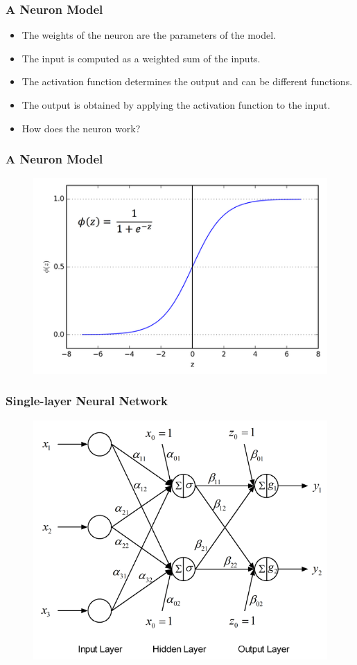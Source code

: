 \documentclass{beamer}
\begin{document}
\begin{frame}
	\frametitle{A Neuron Model}
\begin{itemize}
	\item The weights of the neuron are the parameters of the model.
	\item The input is computed as a weighted sum of the inputs.
	\item The activation function determines the output and can be different functions.
	\item The output is obtained by applying the activation function to the input.
	\item How does the neuron work?
\end{itemize}
\end{frame}

\begin{frame}
	\frametitle{A Neuron Model}
	\begin{figure}
		\includegraphics[width=0.8\linewidth]{sigmoid.png}
	\end{figure}
\end{frame}

\begin{frame}
	\frametitle{Single-layer Neural Network}
	\begin{figure}
		\includegraphics[width=0.8\linewidth]{singlelayer_network1.png}
	\end{figure}
\end{frame}
\end{document}
